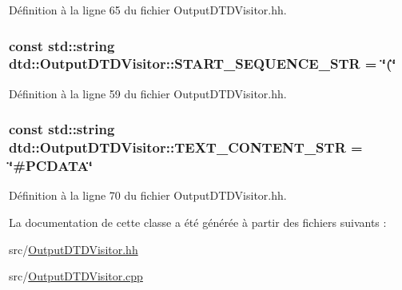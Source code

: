 Définition à la ligne 65 du fichier OutputDTDVisitor.hh.

\hypertarget{classdtd_1_1_output_d_t_d_visitor_a1b325fb88f176ce92e566fe4e6423c1c}{
\subsubsection[{START\_\-SEQUENCE\_\-STR}]{\setlength{\rightskip}{0pt plus 5cm}const std::string {\bf dtd::OutputDTDVisitor::START\_\-SEQUENCE\_\-STR} = \char`\"{}(\char`\"{}}}
\label{classdtd_1_1_output_d_t_d_visitor_a1b325fb88f176ce92e566fe4e6423c1c}


Définition à la ligne 59 du fichier OutputDTDVisitor.hh.

\hypertarget{classdtd_1_1_output_d_t_d_visitor_a83f802e6ceef88d9496b0aedf4d4541e}{
\subsubsection[{TEXT\_\-CONTENT\_\-STR}]{\setlength{\rightskip}{0pt plus 5cm}const std::string {\bf dtd::OutputDTDVisitor::TEXT\_\-CONTENT\_\-STR} = \char`\"{}\#PCDATA\char`\"{}}}
\label{classdtd_1_1_output_d_t_d_visitor_a83f802e6ceef88d9496b0aedf4d4541e}


Définition à la ligne 70 du fichier OutputDTDVisitor.hh.



La documentation de cette classe a été générée à partir des fichiers suivants :\begin{DoxyCompactItemize}
\item 
src/\hyperlink{_output_d_t_d_visitor_8hh}{OutputDTDVisitor.hh}\item 
src/\hyperlink{_output_d_t_d_visitor_8cpp}{OutputDTDVisitor.cpp}\end{DoxyCompactItemize}
